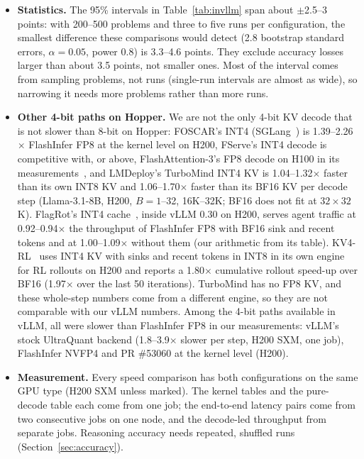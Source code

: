 \documentclass[11pt]{article}
\begin{document}
\begin{itemize}
  \item \textbf{Statistics.} The 95\% intervals in Table~\ref{tab:invllm} span about $\pm$2.5--3 points: with 200--500 problems and three to five runs per configuration, the smallest difference these comparisons would detect (2.8 bootstrap standard errors, $\alpha = 0.05$, power 0.8) is 3.3--4.6 points. They exclude accuracy losses larger than about 3.5 points, not smaller ones. Most of the interval comes from sampling problems, not runs (single-run intervals are almost as wide), so narrowing it needs more problems rather than more runs.
  \item \textbf{Other 4-bit paths on Hopper.} We are not the only 4-bit KV decode that is not slower than 8-bit on Hopper: FOSCAR's INT4 (SGLang~\cite{zheng2023sglang}) is 1.39--2.26$\times$ FlashInfer FP8 at the kernel level on H200, FServe's INT4 decode is competitive with, or above, FlashAttention-3's FP8 decode on H100 in its measurements~\cite{baek2026fserve}, and LMDeploy's TurboMind INT4 KV is 1.04--1.32$\times$ faster than its own INT8 KV and 1.06--1.70$\times$ faster than its BF16 KV per decode step (Llama-3.1-8B, H200, $B = 1$--32, 16K--32K; BF16 does not fit at $32 \times 32$K). FlagRot's INT4 cache~\cite{shao2026flagrot}, inside vLLM 0.30 on H200, serves agent traffic at 0.92--0.94$\times$ the throughput of FlashInfer FP8 with BF16 sink and recent tokens and at 1.00--1.09$\times$ without them (our arithmetic from its table). KV4-RL~\cite{park2026kv4rl} uses INT4 KV with sinks and recent tokens in INT8 in its own engine for RL rollouts on H200 and reports a 1.80$\times$ cumulative rollout speed-up over BF16 (1.97$\times$ over the last 50 iterations). TurboMind has no FP8 KV, and these whole-step numbers come from a different engine, so they are not comparable with our vLLM numbers. Among the 4-bit paths available in vLLM, all were slower than FlashInfer FP8 in our measurements: vLLM's stock UltraQuant backend (1.8--3.9$\times$ slower per step, H200 SXM, one job), FlashInfer NVFP4 and PR \#53060 at the kernel level (H200).
  \item \textbf{Measurement.} Every speed comparison has both configurations on the same GPU type (H200 SXM unless marked). The kernel tables and the pure-decode table each come from one job; the end-to-end latency pairs come from two consecutive jobs on one node, and the decode-led throughput from separate jobs. Reasoning accuracy needs repeated, shuffled runs (Section~\ref{sec:accuracy}).
\end{itemize}
\end{document}
